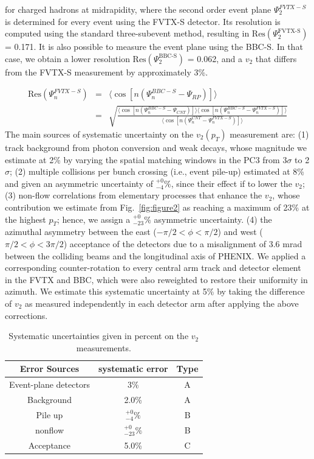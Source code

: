 \documentclass[%
reprint,
showpacs,preprintnumbers,
 amsmath,amssymb,
 aps,
]{revtex4-1}
\newcommand{\pt}{\mbox{$p_T$}\xspace}
\begin{document}
for charged hadrons at midrapidity, where the second order event plane $\Psi^{FVTX-S}_{2}$ is determined for every event using the FVTX-S detector. Its resolution is computed using the standard three-subevent method, resulting in $\text{Res}(\Psi^{\text{FVTX-S}}_{2})$ = 0.171. It is also possible to measure the event plane using the BBC-S. In that case, we obtain a lower resolution $\text{Res}(\Psi^{\text{BBC-S}}_{2})$ = 0.062, and a $v_2$ that differs from the FVTX-S measurement by approximately 3\%.

\begin{eqnarray}
\text{Res}(\Psi^{FVTX-S}_n) &=& \langle \cos[n(\Psi^{BBC-S}_n - \Psi_{RP})] \rangle \\
&=& \sqrt{\frac{\langle \cos[n(\Psi^{BBC-S}_n - \Psi_{CNT})] \rangle \langle \cos[n(\Psi^{BBC-S}_n - \Psi^{FVTX-S}_n)] \rangle}{\langle \cos[n(\Psi^{CNT}_n - \Psi^{FVTX-S}_n)] \rangle}}
\end{eqnarray}
The main sources of systematic uncertainty on the $v_2(p_T)$ measurement are: (1) track background from photon conversion and weak decays, whose magnitude we estimate at 2\% by varying the spatial matching windows in the PC3 from 3$\sigma$ to 2$\sigma$; (2) multiple collisions per bunch crossing (i.e., event pile-up) estimated at 8\% and given an asymmetric uncertainty of $^{+0}_{-4}\%$, since their effect if to lower the $v_2$; (3) non-flow correlations from elementary processes that enhance the $v_2$, whose contribution we estimate from Fig.~\ref{fig:figure2} as reaching a maximum of 23\% at the highest \pt; hence, we assign a $^{+0}_{-23}\%$ asymmetric uncertainty. (4) the azimuthal asymmetry between the east ($-\pi/2 < \phi < \pi/2$) and west ($\pi/2 < \phi < 3\pi/2$) acceptance of the detectors due to a misalignment of 3.6 mrad between the colliding beams and the longitudinal axis of PHENIX. We applied a corresponding counter-rotation to every central arm track and detector element in the FVTX and BBC, which were also reweighted to restore their uniformity in azimuth. We estimate this systematic uncertainty at 5\% by taking the difference of $v_2$ as measured independently in each detector arm after applying the above corrections. 

\label{s:sys}
\begin{table}[htbp]
  \begin{center}
    \begin{tabular}{ccc}
      \hline
      \hline
      Error Sources& systematic error & Type \\ \hline
      Event-plane detectors & 3\% & A\\
      Background &2.0\%& A\\
      Pile up    &$^{+0}_{-4}\%$& B\\
      nonflow    &$^{+0}_{-23}\%$& B\\
      Acceptance &5.0\%& C\\
    \hline
    \hline
    \end{tabular}
   \caption{\label{t:sys}Systematic uncertainties given in percent on the $v_2$ measurements.}
   \end{center}
 \end{table}
\end{document}
